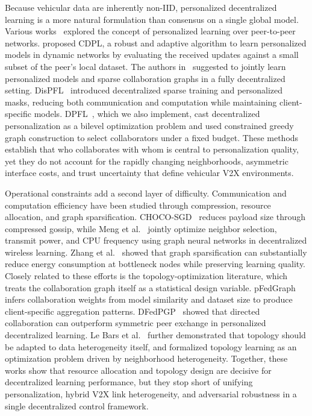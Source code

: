 Because vehicular data are inherently non-IID, personalized decentralized learning is a more natural formulation than consensus on a single global model. Various works~\cite{vanhaesebrouck2017decentralized,boubouh2020robust,basmadjian2022advantages} explored the concept of personalized learning over peer-to-peer networks. \cite{boubouh2020robust} proposed CDPL, a robust and adaptive algorithm to learn personalized models in dynamic networks by evaluating the received updates against a small subset of the peer's local dataset. The authors in~\cite{zantedeschi2020fully} suggested to jointly learn personalized models and sparse collaboration graphs in a fully decentralized setting. DisPFL~\cite{dai2022dispfl} introduced decentralized sparse training and personalized masks, reducing both communication and computation while maintaining client-specific models. DPFL~\cite{kharrat2025dpfl}, which we also implement, cast decentralized personalization as a bilevel optimization problem and used constrained greedy graph construction to select collaborators under a fixed budget. These methods establish that who collaborates with whom is central to personalization quality, yet they do not account for the rapidly changing neighborhoods, asymmetric interface costs, and trust uncertainty that define vehicular V2X environments.

Operational constraints add a second layer of difficulty. Communication and computation efficiency have been studied through compression, resource allocation, and graph sparsification. CHOCO-SGD~\cite{koloskova2019choco} reduces payload size through compressed gossip, while Meng et al.~\cite{meng2025resource} jointly optimize neighbor selection, transmit power, and CPU frequency using graph neural networks in decentralized wireless learning. Zhang et al.~\cite{zhang2024energy} showed that graph sparsification can substantially reduce energy consumption at bottleneck nodes while preserving learning quality. Closely related to these efforts is the topology-optimization literature, which treats the collaboration graph itself as a statistical design variable. pFedGraph~\cite{ye2023pfedgraph} infers collaboration weights from model similarity and dataset size to produce client-specific aggregation patterns. DFedPGP~\cite{liu2024dfedpgp} showed that directed collaboration can outperform symmetric peer exchange in personalized decentralized learning. Le Bars et al.~\cite{lebars2023topology} further demonstrated that topology should be adapted to data heterogeneity itself, and formalized topology learning as an optimization problem driven by neighborhood heterogeneity. Together, these works show that resource allocation and topology design are decisive for decentralized learning performance, but they stop short of unifying personalization, hybrid V2X link heterogeneity, and adversarial robustness in a single decentralized control framework.

